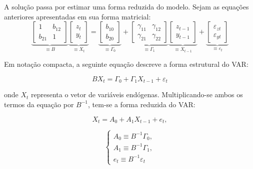A solução passa por estimar uma forma reduzida do modelo. Sejam as equações anteriores apresentadas em sua forma matricial:
\begin{equation}
\underbrace{\begin{bmatrix} 1 & b_{12} \\ b_{21} & 1 \end{bmatrix}}_{\equiv B}
\underbrace{\begin{bmatrix} z_t \\ y_t \end{bmatrix}}_{\equiv X_t}
=
\underbrace{\begin{bmatrix} b_{10} \\ b_{20} \end{bmatrix}}_{\equiv \Gamma_0}
+
\underbrace{\begin{bmatrix} \gamma_{11} & \gamma_{12} \\ \gamma_{21} & \gamma_{22} \end{bmatrix}}_{\equiv \Gamma_1}
\underbrace{\begin{bmatrix} z_{t-1} \\ y_{t-1} \end{bmatrix}}_{\equiv X_{t-1}}
+
\underbrace{\begin{bmatrix} \varepsilon_{zt} \\ \varepsilon_{yt} \end{bmatrix}}_{\equiv \varepsilon_t}
\end{equation}

Em notação compacta, a seguinte equação descreve a forma estrutural do VAR:

\begin{equation}
BX_t = \Gamma_0 + \Gamma_1X_{t-1} + \varepsilon_t
\end{equation}

onde \(X_t\) representa o vetor de variáveis endógenas. Multiplicando-se ambos os termos da equação por \( B^{-1}\), tem-se a forma reduzida do VAR:

\begin{equation}
X_t = A_0 + A_1X_{t-1} + e_t, 
\end{equation}

\begin{equation}
\left\{ 
\begin{array}{l}
A_0 \equiv B^{-1}\Gamma_0, \\
A_1 \equiv B^{-1}\Gamma_1, \\
e_t \equiv B^{-1}\varepsilon_t
\end{array} 
\right.
\end{equation}

